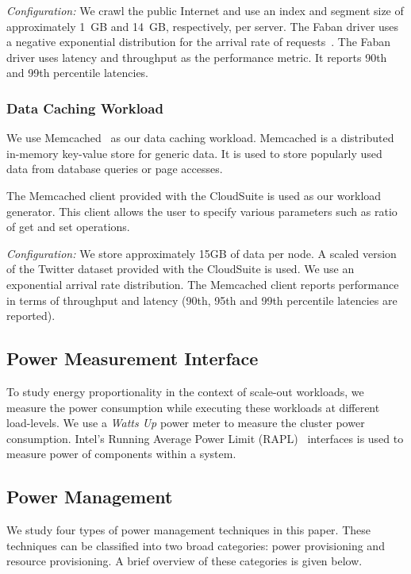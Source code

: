 \documentclass{sig-alternate}
\begin{document}
\emph{Configuration:} We crawl the public Internet and use an index and segment size of approximately 
1~GB and 14~GB, respectively, per server. The Faban driver uses a negative 
exponential distribution for the arrival rate of requests~\cite{fabandesign}. The Faban 
driver uses latency and throughput as the performance metric. It reports 
90th and 99th percentile latencies. 

\subsubsection{Data Caching Workload}

We use Memcached~\cite{memcachedweb} as our data caching workload. Memcached is a distributed 
in-memory key-value store for generic data. It is used to store popularly 
used data from database queries or page accesses. 

The Memcached client provided with the CloudSuite is used as our workload 
generator. This client allows the user to specify various parameters such 
as ratio of get and set operations. 

\emph{Configuration:} We store approximately 15GB of data per node. A 
scaled version of the Twitter dataset provided with the CloudSuite is used.
We use an exponential arrival rate distribution. The Memcached client 
reports performance in terms of throughput and latency (90th, 95th and 
99th percentile latencies are reported). 

\subsection{Power Measurement Interface}

To study energy proportionality in the context of scale-out workloads, we 
measure the power consumption while executing these workloads at different 
load-levels. We use a \emph{Watts Up} power meter to measure the cluster power 
consumption. Intel's Running Average Power
Limit (RAPL)~\cite{intelsdm,rapl} interfaces is used to measure power of 
components within a system.

\subsection{Power Management}

We study four types of power management techniques in this 
paper. These techniques can be classified into two broad categories: power 
provisioning and resource provisioning. A brief overview of these categories 
is given below. 
\end{document}
